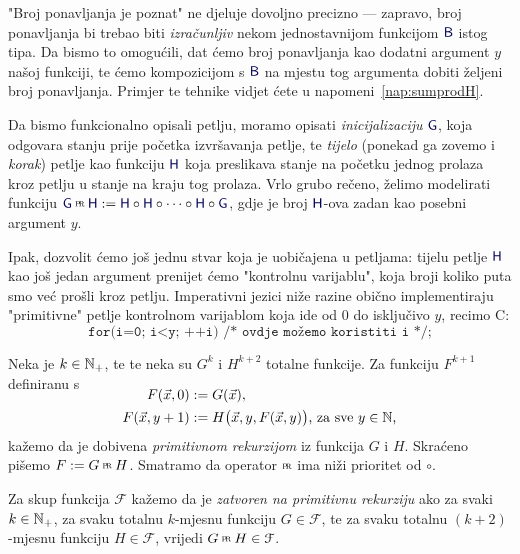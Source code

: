 "Broj ponavljanja je poznat" ne djeluje dovoljno precizno --- zapravo, broj ponavljanja bi trebao biti \emph{izračunljiv} nekom jednostavnijom funkcijom $\f B$ istog tipa. 
Da bismo to omogućili, dat ćemo broj ponavljanja kao dodatni argument $y$ našoj funkciji, te ćemo kompozicijom s $\f B$ na mjestu tog argumenta dobiti željeni broj ponavljanja. Primjer te tehnike vidjet ćete u napomeni~\ref{nap:sumprodH}.

Da bismo funkcionalno opisali petlju, moramo opisati \emph{inicijalizaciju} $\f G$, koja odgovara stanju prije početka izvršavanja petlje, te \emph{tijelo} (ponekad ga zovemo i \emph{korak}) petlje kao funkciju $\f H$ koja preslikava stanje na početku jednog prolaza kroz petlju u stanje na kraju tog prolaza. Vrlo grubo rečeno, želimo modelirati funkciju $\f G\pr\f H:=\f H\circ\f H\circ\dotsb\circ\f  H\circ\f G$, gdje je broj $\f H$-ova zadan kao posebni argument $y$.

Ipak, dozvolit ćemo još jednu stvar koja je uobičajena u petljama: tijelu petlje $\f H$ kao još jedan argument prenijet ćemo "kontrolnu varijablu", koja broji koliko puta smo već prošli kroz petlju. Imperativni jezici niže razine obično implementiraju "primitivne" petlje kontrolnom varijablom koja ide od $0$ do isključivo $y$, recimo C:
\begin{equation}\label{prog:Cprloop}
\texttt{for(i=0; i<y; ++i) /* ovdje možemo koristiti i */;}
\end{equation}


\begin{definicija}\label{def:pr}
Neka je $k\in{\mathbb N}_+$, te te neka su $G^k$ i $H^{k+2}$ totalne funkcije. Za funkciju $F^{k+1}$ definiranu s
\begin{align}
\SwapAboveDisplaySkip
\label{eq:defprb}
F(\vec x,0)&:=G(\vec x)\text,\\
\label{eq:defprk}
F(\vec x,y+1)&:=H\bigl(\vec x,y,F(\vec x,y)\bigr)\text{, za sve $y\in\N$,}
\end{align}
kažemo da je dobivena \emph{primitivnom rekurzijom} iz funkcija $G$ i $H$. Skraćeno pišemo $F:=G\pr H$. Smatramo da operator $\pr$ ima niži prioritet od $\circ$.

Za skup funkcija $\mathcal F$ kažemo da je \emph{zatvoren na primitivnu rekurziju} ako za svaki $k\in{\mathbb N}_+$, za svaku totalnu $k$-mjesnu funkciju $G\in\mathcal F$, te za svaku totalnu $(k+2)$-mjesnu funkciju $H\in\mathcal F$, vrijedi $G\pr H\in\mathcal F$.
\end{definicija}


